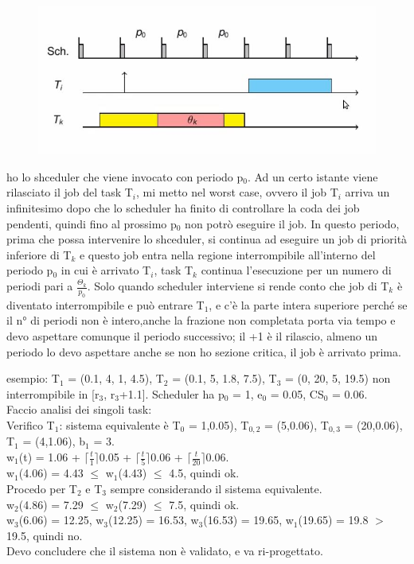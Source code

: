 \documentclass[12pt, oneside]{extbook}
\begin{document}
\begin{itemize}
\begin{figure}[!h]
\centering
\includegraphics[scale=0.4]{immagini/image-008.jpg}
\end{figure}
ho lo shceduler che viene invocato con periodo p$_{0}$. Ad un certo istante viene rilasciato il job del task T$_{i}$, mi metto nel worst case, ovvero il job T$_{i}$ arriva un infinitesimo dopo che lo scheduler ha finito di controllare la coda dei job pendenti, quindi fino al prossimo p$_{0}$ non potrò eseguire il job. In questo periodo, prima che possa intervenire lo shceduler, si continua ad eseguire un job di priorità inferiore di T$_{k}$ e questo job entra nella regione interrompibile all'interno del periodo p$_{0}$ in cui è arrivato T$_{i}$, task T$_{k}$ continua l'esecuzione per un numero di periodi pari a $\frac{\Theta_{k}}{p_{0}}$. Solo quando scheduler interviene si rende conto che job di T$_{k}$ è diventato interrompibile e può entrare T$_{1}$, e c'è la parte intera superiore perché se il n° di periodi non è intero,anche la frazione non completata porta via tempo e devo aspettare comunque il periodo successivo; il +1 è il rilascio, almeno un periodo lo devo aspettare anche se non ho sezione critica, il job è arrivato prima.
\end{itemize}
esempio: T$_{1}$ = (0.1, 4, 1, 4.5), T$_{2}$ = (0.1, 5, 1.8, 7.5), T$_{3}$ = (0, 20, 5, 19.5) non interrompibile in [r$_{3}$, r$_{3}$+1.1]. Scheduler ha p$_{0}$ = 1, e$_{0}$ = 0.05, CS$_{0}$ = 0.06.\\ Faccio analisi dei singoli task:\\
Verifico T$_{1}$: sistema equivalente è T$_{0}$ = 1,0.05), T$_{0,2}$ = (5,0.06), T$_{0,3}$ = (20,0.06), T$_{1}$ = (4,1.06), b$_{1}$ = 3.\\ w$_{1}$(t)
 = 1.06 + $\lceil \frac{t}{1}\rceil$0.05 + $\lceil \frac{t}{5}\rceil$0.06 + $\lceil \frac{t}{20}\rceil$0.06.\\
w$_{1}$(4.06) = 4.43 $\leq$ w$_{1}$(4.43) $\leq$ 4.5, quindi ok.\\
Procedo per T$_{2}$ e T$_{3}$ sempre considerando il sistema equivalente.\\ w$_{2}$(4.86) = 7.29 $\leq$ w$_{2}$(7.29) $\leq$ 7.5, quindi ok.\\
w$_{3}$(6.06) = 12.25,  w$_{3}$(12.25) = 16.53, w$_{3}$(16.53) = 19.65, w$_{1}$(19.65) = 19.8 $>$ 19.5, quindi no.\\ Devo concludere che il sistema non è validato, e va ri-progettato.
\end{document}
